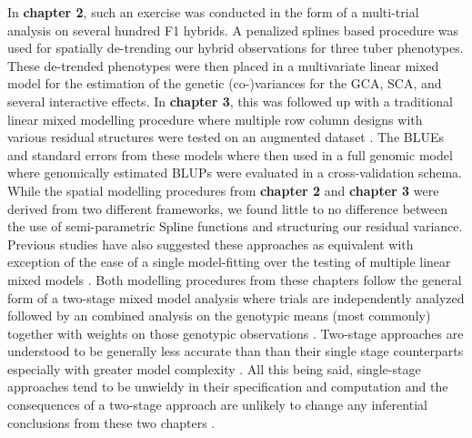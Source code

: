 \documentclass[
]{article}
\begin{document}
In \textbf{chapter 2}, such an exercise was conducted in the form of a
multi-trial analysis on several hundred F1 hybrids. A penalized splines
based procedure was used for spatially de-trending our hybrid
observations for three tuber phenotypes. These de-trended phenotypes
were then placed in a multivariate linear mixed model for the estimation
of the genetic (co-)variances for the GCA, SCA, and several interactive
effects. In \textbf{chapter 3}, this was followed up with a traditional
linear mixed modelling procedure where multiple row column designs with
various residual structures were tested on an augmented dataset
\autocite{Gilmour1997}. The BLUEs and standard errors from these models
where then used in a full genomic model where genomically estimated
BLUPs were evaluated in a cross-validation schema. While the spatial
modelling procedures from \textbf{chapter 2} and \textbf{chapter 3} were
derived from two different frameworks, we found little to no difference
between the use of semi-parametric Spline functions and structuring our
residual variance. Previous studies have also suggested these approaches
as equivalent with exception of the ease of a single model-fitting over
the testing of multiple linear mixed models \autocite{Velazco2017}. Both
modelling procedures from these chapters follow the general form of a
two-stage mixed model analysis where trials are independently analyzed
followed by an combined analysis on the genotypic means (most commonly)
together with weights on those genotypic observations
\autocite{Piepho2012}. Two-stage approaches are understood to be
generally less accurate than than their single stage counterparts
especially with greater model complexity \autocite{Gogel2018}. All this
being said, single-stage approaches tend to be unwieldy in their
specification and computation and the consequences of a two-stage
approach are unlikely to change any inferential conclusions from these
two chapters \autocite{Damesa2017}.
\end{document}

